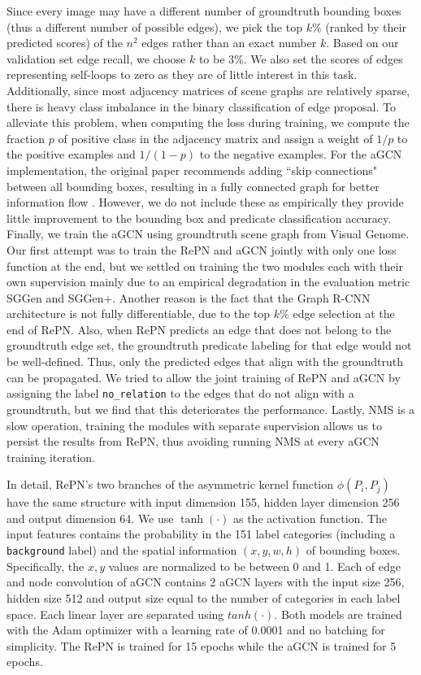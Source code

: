 Since every image may have a different number of groundtruth bounding boxes (thus a different number of possible edges), we pick the top $k\%$ (ranked by their predicted scores) of the $n^2$ edges rather than an exact number $k$. Based on our validation set edge recall, we choose $k$ to be $3\%$. We also set the scores of edges representing self-loops to zero as they are of little interest in this task. Additionally, since most adjacency matrices of scene graphs are relatively sparse, there is heavy class imbalance in the binary classification of edge proposal. To alleviate this problem, when computing the loss during training, we compute the fraction $p$ of positive class in the adjacency matrix and assign a weight of $1/p$ to the positive examples and  $1/(1-p)$ to the negative examples. For the aGCN implementation, the original paper recommends adding ``skip connections" between all bounding boxes, resulting in a fully connected graph for better information flow \cite{yang2018graph}. However, we do not include these as empirically they provide little improvement to the bounding box and predicate classification accuracy. Finally, we train the aGCN using groundtruth scene graph from Visual Genome. Our first attempt was to train the RePN and aGCN jointly with only one loss function at the end, but we settled on training the two modules each with their own supervision mainly due to an empirical degradation in the evaluation metric SGGen and SGGen+. Another reason is the fact that the Graph R-CNN architecture is not fully differentiable, due to the top $k\%$ edge selection at the end of RePN. Also, when RePN predicts an edge that does not belong to the groundtruth edge set, the groundtruth predicate labeling for that edge would not be well-defined. Thus, only the predicted edges that align with the groundtruth can be propagated. We tried to allow the joint training of RePN and aGCN by assigning the label \texttt{no\_relation} to the edges that do not align with a groundtruth, but we find that this deteriorates the performance. Lastly, NMS is a slow operation, training the modules with separate supervision allows us to persist the results from RePN, thus avoiding running NMS at every aGCN training iteration.

In detail, RePN's two branches of the asymmetric kernel function $\phi(P_i, P_j)$ have the same structure with input dimension 155, hidden layer dimension 256 and output dimension 64. We use $\tanh(\cdot)$ as the  activation function. The input features contains the probability in the 151 label categories (including a \texttt{background} label) and the spatial information $(x, y, w, h)$ of bounding boxes. Specifically, the $x, y$ values are normalized to be between 0 and 1. Each of edge and node convolution of aGCN contains 2 aGCN layers with the input size 256, hidden size 512 and output size equal to the number of categories in each label space. Each linear layer are separated using $tanh(\cdot)$. Both models are trained with the Adam optimizer \cite{kingma2014adam} with a learning rate of 0.0001 and no batching for simplicity. The RePN is trained for 15 epochs while the aGCN is trained for 5 epochs. 

